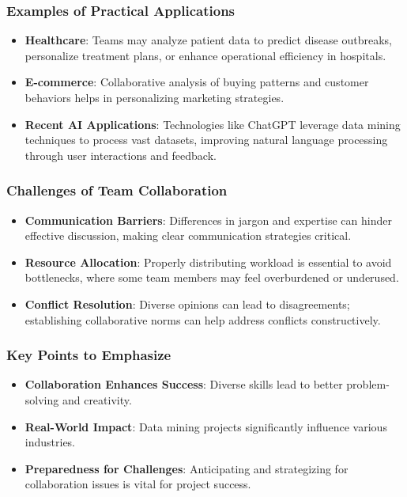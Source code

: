 \documentclass[aspectratio=169]{beamer}
\begin{document}
\begin{frame}[fragile]
    \frametitle{Examples of Practical Applications}
    \begin{itemize}
        \item \textbf{Healthcare}: 
        Teams may analyze patient data to predict disease outbreaks, personalize treatment plans, or enhance operational efficiency in hospitals.
        
        \item \textbf{E-commerce}: 
        Collaborative analysis of buying patterns and customer behaviors helps in personalizing marketing strategies.
        
        \item \textbf{Recent AI Applications}: 
        Technologies like ChatGPT leverage data mining techniques to process vast datasets, improving natural language processing through user interactions and feedback.
    \end{itemize}
\end{frame}

\begin{frame}[fragile]
    \frametitle{Challenges of Team Collaboration}
    \begin{itemize}
        \item \textbf{Communication Barriers}: Differences in jargon and expertise can hinder effective discussion, making clear communication strategies critical.
        
        \item \textbf{Resource Allocation}: Properly distributing workload is essential to avoid bottlenecks, where some team members may feel overburdened or underused.
        
        \item \textbf{Conflict Resolution}: Diverse opinions can lead to disagreements; establishing collaborative norms can help address conflicts constructively.
    \end{itemize}
\end{frame}

\begin{frame}[fragile]
    \frametitle{Key Points to Emphasize}
    \begin{itemize}
        \item \textbf{Collaboration Enhances Success}: Diverse skills lead to better problem-solving and creativity.
        
        \item \textbf{Real-World Impact}: Data mining projects significantly influence various industries.
        
        \item \textbf{Preparedness for Challenges}: Anticipating and strategizing for collaboration issues is vital for project success.
    \end{itemize}
\end{frame}
\end{document}
